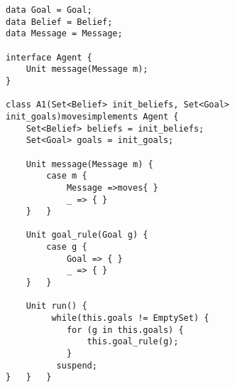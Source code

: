 \begin{lstlisting}[caption= Generic Agent Model, label=Agent]
data Goal = Goal;
data Belief = Belief;
data Message = Message;

interface Agent {
	Unit message(Message m);
}

class A1(Set<Belief> init_beliefs, Set<Goal> init_goals)movesimplements Agent {
	Set<Belief> beliefs = init_beliefs;
	Set<Goal> goals = init_goals;
	
	Unit message(Message m) {
		case m { 
			Message =>moves{ }
			_ => { }
	}	}
	
	Unit goal_rule(Goal g) {
		case g {
			Goal => { }
			_ => { }
	}	}
	
	Unit run() {
		 while(this.goals != EmptySet) {
  		    for (g in this.goals) {
		        this.goal_rule(g);
		    }
		  suspend;
}	}	}
\end{lstlisting}









%
%
%
%	



